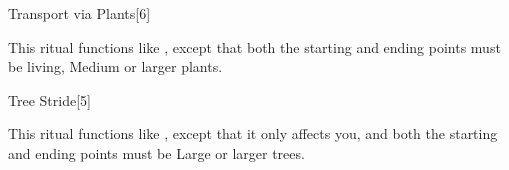 \begin{spellsection}{Transport via Plants}[6]
    \begin{spellheader}
    \end{spellheader}
    \begin{spellcontent}
        \begin{spelltargetinginfo}
        \end{spelltargetinginfo}
        \begin{spelleffects}

            \spellline
            \spelleffect This ritual functions like , except that both the starting and ending points must be living, Medium or larger plants.
        \end{spelleffects}
    \end{spellcontent}
    \begin{spellfooter}
    \end{spellfooter}
\end{spellsection}

\begin{spellsection}{Tree Stride}[5]
    \begin{spellheader}
    \end{spellheader}
    \begin{spellcontent}
        \begin{spelltargetinginfo}
        \end{spelltargetinginfo}
        \begin{spelleffects}

            \spellspecial This ritual functions like , except that it only affects you, and both the starting and ending points must be Large or larger trees.
        \end{spelleffects}
    \end{spellcontent}
    \begin{spellfooter}
    \end{spellfooter}
\end{spellsection}

